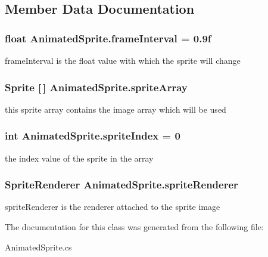 \subsection{Member Data Documentation}
\hypertarget{class_animated_sprite_a70ddec1e72a29a25c16175c7dc53decf}{
\subsubsection[{frame\-Interval}]{\setlength{\rightskip}{0pt plus 5cm}float Animated\-Sprite.\-frame\-Interval = 0.\-9f}}\label{class_animated_sprite_a70ddec1e72a29a25c16175c7dc53decf}
frame\-Interval is the float value with which the sprite will change \hypertarget{class_animated_sprite_a8c8ae3e620f9b0029dca501c5d6dd1a1}{
\subsubsection[{sprite\-Array}]{\setlength{\rightskip}{0pt plus 5cm}Sprite \mbox{[}$\,$\mbox{]} Animated\-Sprite.\-sprite\-Array}}\label{class_animated_sprite_a8c8ae3e620f9b0029dca501c5d6dd1a1}
this sprite array contains the image array which will be used \hypertarget{class_animated_sprite_ad2906feaf88a9334c785e7f2bb32f2ad}{
\subsubsection[{sprite\-Index}]{\setlength{\rightskip}{0pt plus 5cm}int Animated\-Sprite.\-sprite\-Index = 0}}\label{class_animated_sprite_ad2906feaf88a9334c785e7f2bb32f2ad}
the index value of the sprite in the array \hypertarget{class_animated_sprite_a7f733f377e105ea251accd4d6018b5f7}{
\subsubsection[{sprite\-Renderer}]{\setlength{\rightskip}{0pt plus 5cm}Sprite\-Renderer Animated\-Sprite.\-sprite\-Renderer}}\label{class_animated_sprite_a7f733f377e105ea251accd4d6018b5f7}
sprite\-Renderer is the renderer attached to the sprite image 

The documentation for this class was generated from the following file\-:\begin{DoxyCompactItemize}
\item 
Animated\-Sprite.\-cs\end{DoxyCompactItemize}
